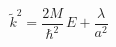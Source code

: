 \begin{equation}
\tilde{k}^2
= 
\frac{2M}{\hbar^{2}} \,   
E
+\frac{\lambda}{ a^2} 
\;  
\label{eq:wave_number_2D_ISP_circular_well_reg}
\end{equation}

